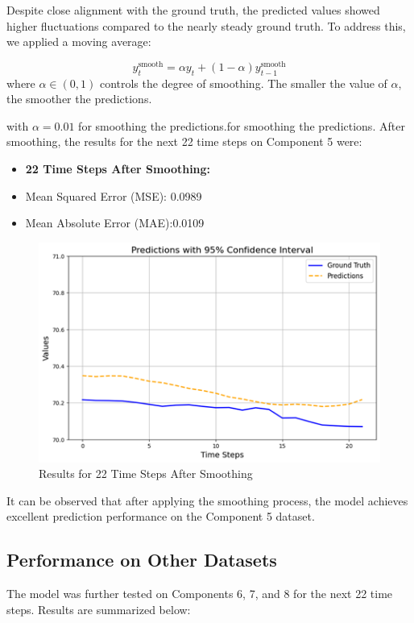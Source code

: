 Despite close alignment with the ground truth, the predicted values showed higher fluctuations compared to the nearly steady ground truth. To address this, we applied a moving average:

\begin{equation}
	y_t^{\text{smooth}} = \alpha y_t + (1-\alpha)y_{t-1}^{\text{smooth}}
\end{equation}
where $\alpha \in (0, 1)$ controls the degree of smoothing. The smaller the value of $\alpha$, the smoother the predictions.

with $\alpha=0.01$ for smoothing the predictions.for smoothing the predictions. After smoothing, the results for the next 22 time steps on Component 5 were:

\begin{itemize}
	\item \textbf{22 Time Steps After Smoothing:}
	\item Mean Squared Error (MSE): 0.0989
	\item Mean Absolute Error (MAE):0.0109
\end{itemize}
	\begin{figure}[h!]
	\centering
	\includegraphics[width=0.8\linewidth]{figures/22no5}
	\caption{Results for 22 Time Steps After Smoothing}
	\label{fig:22no5}
\end{figure}
It can be observed that after applying the smoothing process, the model achieves excellent prediction performance on the Component 5 dataset.
\subsection{Performance on Other Datasets}
\label{subsec:Performance}
The model was further tested on Components  6, 7, and 8 for the next 22 time steps. Results are summarized below:

